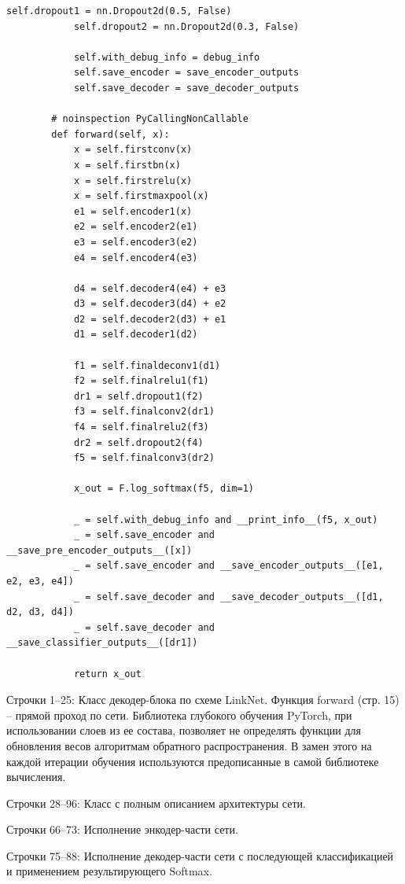 \begin{lstlisting}[python]
            self.dropout1 = nn.Dropout2d(0.5, False)
            self.dropout2 = nn.Dropout2d(0.3, False)

            self.with_debug_info = debug_info
            self.save_encoder = save_encoder_outputs
            self.save_decoder = save_decoder_outputs

        # noinspection PyCallingNonCallable
        def forward(self, x):
            x = self.firstconv(x)
            x = self.firstbn(x)
            x = self.firstrelu(x)
            x = self.firstmaxpool(x)
            e1 = self.encoder1(x)
            e2 = self.encoder2(e1)
            e3 = self.encoder3(e2)
            e4 = self.encoder4(e3)

            d4 = self.decoder4(e4) + e3
            d3 = self.decoder3(d4) + e2
            d2 = self.decoder2(d3) + e1
            d1 = self.decoder1(d2)

            f1 = self.finaldeconv1(d1)
            f2 = self.finalrelu1(f1)
            dr1 = self.dropout1(f2)
            f3 = self.finalconv2(dr1)
            f4 = self.finalrelu2(f3)
            dr2 = self.dropout2(f4)
            f5 = self.finalconv3(dr2)

            x_out = F.log_softmax(f5, dim=1)

            _ = self.with_debug_info and __print_info__(f5, x_out)
            _ = self.save_encoder and __save_pre_encoder_outputs__([x])
            _ = self.save_encoder and __save_encoder_outputs__([e1, e2, e3, e4])
            _ = self.save_decoder and __save_decoder_outputs__([d1, d2, d3, d4])
            _ = self.save_decoder and __save_classifier_outputs__([dr1])

            return x_out
\end{lstlisting}

Строчки 1--25: Класс декодер-блока по схеме LinkNet.
Функция forward (стр. 15) -- прямой проход по сети.
Библиотека глубокого обучения PyTorch, при использовании слоев из ее состава,
позволяет не определять функции для обновления весов алгоритмам обратного распространения.
В замен этого на каждой итерации обучения используются предописанные в самой библиотеке вычисления.

Строчки 28--96: Класс с полным описанием архитектуры сети.

Строчки 66--73: Исполнение энкодер-части сети.

Строчки 75--88: Исполнение декодер-части сети с последующей классификацией и применением результирующего Softmax.


